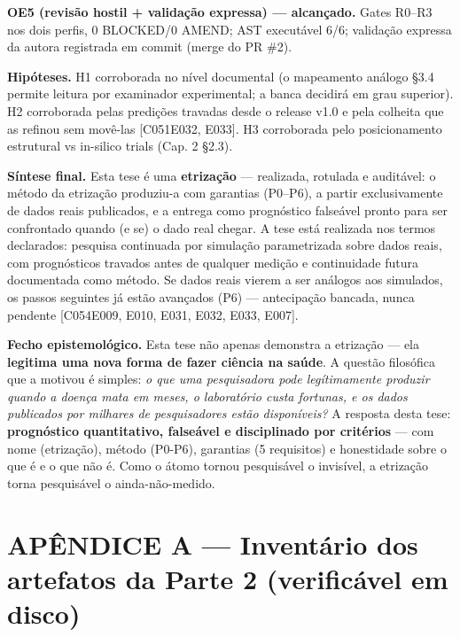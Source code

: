 \documentclass[
  10pt,
]{article}
\begin{document}
\textbf{OE5 (revisão hostil + validação expressa) --- alcançado.} Gates
R0--R3 nos dois perfis, 0 BLOCKED/0 AMEND; AST executável 6/6; validação
expressa da autora registrada em commit (merge do PR \#2).

\textbf{Hipóteses.} H1 corroborada no nível documental (o mapeamento
análogo §3.4 permite leitura por examinador experimental; a banca
decidirá em grau superior). H2 corroborada pelas predições travadas
desde o release v1.0 e pela colheita que as refinou sem movê-las
{[}C051\textbar E032, E033{]}. H3 corroborada pelo posicionamento
estrutural vs in-silico trials (Cap. 2 §2.3).

\textbf{Síntese final.} Esta tese é uma \textbf{etrização} ---
realizada, rotulada e auditável: o método da etrização produziu-a com
garantias (P0--P6), a partir exclusivamente de dados reais publicados, e
a entrega como prognóstico falseável pronto para ser confrontado quando
(e se) o dado real chegar. A tese está realizada nos termos declarados:
pesquisa continuada por simulação parametrizada sobre dados reais, com
prognósticos travados antes de qualquer medição e continuidade futura
documentada como método. Se dados reais vierem a ser análogos aos
simulados, os passos seguintes já estão avançados (P6) --- antecipação
bancada, nunca pendente {[}C054\textbar E009, E010, E031, E032, E033,
E007{]}.

\textbf{Fecho epistemológico.} Esta tese não apenas demonstra a
etrização --- ela \textbf{legitima uma nova forma de fazer ciência na
saúde}. A questão filosófica que a motivou é simples: \emph{o que uma
pesquisadora pode legítimamente produzir quando a doença mata em meses,
o laboratório custa fortunas, e os dados publicados por milhares de
pesquisadores estão disponíveis?} A resposta desta tese:
\textbf{prognóstico quantitativo, falseável e disciplinado por
critérios} --- com nome (etrização), método (P0-P6), garantias (5
requisitos) e honestidade sobre o que é e o que não é. Como o átomo
tornou pesquisável o invisível, a etrização torna pesquisável o
ainda-não-medido.

\hypertarget{apuxeandice-a-inventuxe1rio-dos-artefatos-da-parte-2-verificuxe1vel-em-disco}{%
\section{APÊNDICE A --- Inventário dos artefatos da Parte 2 (verificável
em
disco)}\label{apuxeandice-a-inventuxe1rio-dos-artefatos-da-parte-2-verificuxe1vel-em-disco}}
\end{document}
